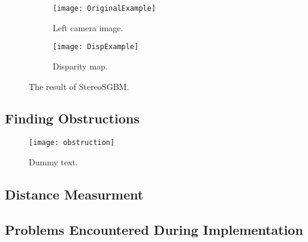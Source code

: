 \begin{figure}
\centering
 \begin{subfigure}[b]{0.45\textwidth}
        \texttt{[image: OriginalExample]}
        \caption{Left camera image.}
        \label{fig:OriginalExample}
    \end{subfigure}
    \begin{subfigure}[b]{0.45\textwidth}
        \texttt{[image: DispExample]}
        \caption{Disparity map.}
        \label{fig:DispExample}
    \end{subfigure}
    \caption{\label{fig:StereoMatching}The result of StereoSGBM.}
\end{figure}

\subsection{Finding Obstructions}

\begin{figure}
	\texttt{[image: obstruction]}
	\caption{Dummy text. }
	\label{fig:obstruction}
\end{figure}

\subsection{Distance Measurment}

\subsection{Problems Encountered During Implementation }